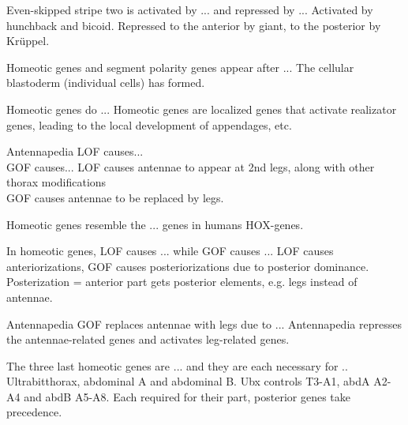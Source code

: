 \begin{flashcard}{Even-skipped stripe two is activated by ... and repressed by ... }
    Activated by hunchback and bicoid. Repressed to the anterior by giant, to the posterior by Krüppel.
\end{flashcard}

\begin{flashcard}{Homeotic genes and segment polarity genes appear after ...}
    The cellular blastoderm (individual cells) has formed.
\end{flashcard}

\begin{flashcard}{Homeotic genes do ...}
    Homeotic genes are localized genes that activate realizator genes, leading to the local development of appendages, etc. 
\end{flashcard}

\begin{flashcard}{Antennapedia LOF causes... \\ GOF causes...}
    LOF causes antennae to appear at 2nd legs, along with other thorax modifications \\
    GOF causes antennae to be replaced by legs.
\end{flashcard}

\begin{flashcard}{Homeotic genes resemble the ... genes in humans}
    HOX-genes.
\end{flashcard}

\begin{flashcard}{In homeotic genes, LOF causes ... while GOF causes ...}
    LOF causes anteriorizations, GOF causes posteriorizations due to posterior dominance. Posterization = anterior part gets posterior elements, e.g. legs instead of antennae.
\end{flashcard}

\begin{flashcard}{Antennapedia GOF replaces antennae with legs due to ...}
    Antennapedia represses the antennae-related genes and activates leg-related genes.
\end{flashcard}

\begin{flashcard}{The three last homeotic genes are ... and they are each necessary for ..}
    Ultrabitthorax, abdominal A and abdominal B. Ubx controls T3-A1, abdA A2-A4 and abdB A5-A8. Each required for their part, posterior genes take precedence.
\end{flashcard}
